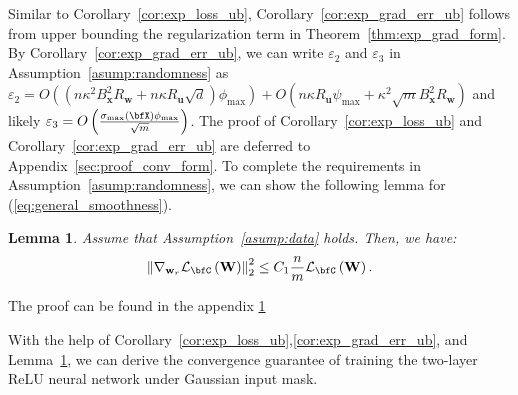 \documentclass[10pt]{article} %
\newtheorem{lemma}[theorem]{Lemma}
\theoremstyle{definition}
\theoremstyle{plain}
\newcommand{\paren}[1]{\left(#1\right)}
\newcommand{\norm}[1]{\left\|#1\right\|}
\def\calL{{\mathcal{L}}}
\def\bfu{{\mathbf{u}}}\def\bfv{{\mathbf{v}}}\def\bfw{{\mathbf{w}}}\def\bfx{{\mathbf{x}}}
\begin{document}
Similar to Corollary~\ref{cor:exp_loss_ub}, Corollary~\ref{cor:exp_grad_err_ub} follows from upper bounding the regularization term in Theorem~\ref{thm:exp_grad_form}. By Corollary~\ref{cor:exp_grad_err_ub}, we can write $\varepsilon_2$ and $\varepsilon_3$ in Assumption~\ref{asump:randomness} as $\varepsilon_2 = O\paren{\paren{n\kappa^2B_{\bfx}^2R_{\bfw} + n\kappa R_{\bfu}\sqrt{d}}\phi_{\max}} + O\paren{n\kappa R_{\bfu}\psi_{\max}+\kappa^2\sqrt{m}B_{\bfx}^2R_{\bfw}}$ and likely $\varepsilon_3 = O\paren{\frac{\sigma_{\max}\paren{\bfX}\phi_{\max}}{\sqrt{m}}}$. The proof of Corollary~\ref{cor:exp_loss_ub} and Corollary~\ref{cor:exp_grad_err_ub} are deferred to Appendix~\ref{sec:proof_conv_form}. To complete the requirements in Assumption~\ref{asump:randomness}, we can show the following lemma for (\ref{eq:general_smoothness}).

\begin{lemma}
    \label{lem:general_smoothness}
    Assume that Assumption~\ref{asump:data} holds. Then, we have:
    \[
\norm{\nabla_{\bfw_r}\calL_{\bfC}\paren{\mathbf{W}}}_2^2\leq C_1\frac{n}{m}\calL_{\bfC}\paren{\mathbf{W}}.
    \]
\end{lemma}
The proof can be found in the appendix \ref{lem:general_smoothness}

With the help of Corollary~\ref{cor:exp_loss_ub},\ref{cor:exp_grad_err_ub}, and Lemma~\ref{lem:general_smoothness}, we can derive the convergence guarantee of training the two-layer ReLU neural network under Gaussian input mask.
\end{document}
